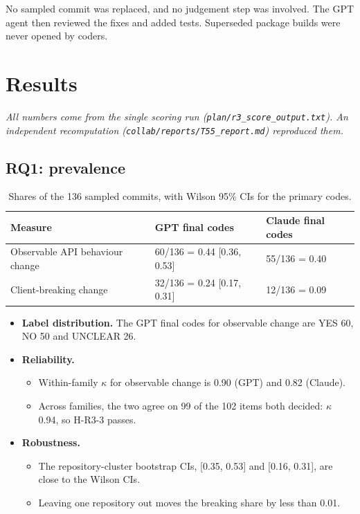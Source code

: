 \documentclass[conference]{IEEEtran}
\begin{document}
No sampled commit was replaced, and no judgement step was involved. The GPT agent then reviewed the fixes and added tests. Superseded package builds were never opened by coders.

\section{Results}
\emph{All numbers come from the single scoring run (\texttt{plan/\allowbreak{}r3\_score\_output.txt}). An independent recomputation (\texttt{collab/\allowbreak{}reports/\allowbreak{}T55\_report.md}) reproduced them.}

\subsection{RQ1: prevalence}
\begin{table}[t]
\caption{Shares of the 136 sampled commits, with Wilson 95\% CIs for the primary codes.}
\footnotesize
\begin{tabularx}{\linewidth}{Xll}
\toprule
Measure & GPT final codes & Claude final codes \\
\midrule
Observable API behaviour change & 60/136 = 0.44 [0.36, 0.53] & 55/136 = 0.40 \\
Client-breaking change & 32/136 = 0.24 [0.17, 0.31] & 12/136 = 0.09 \\
\bottomrule
\end{tabularx}
\end{table}

\begin{itemize}
\item \textbf{Label distribution.} The GPT final codes for observable change are YES 60, NO 50 and UNCLEAR 26.
\item \textbf{Reliability.}
\begin{itemize}
\item Within-family $\kappa$ for observable change is 0.90 (GPT) and 0.82 (Claude).
\item Across families, the two agree on 99 of the 102 items both decided: $\kappa$ 0.94, so H-R3-3 passes.
\end{itemize}
\item \textbf{Robustness.}
\begin{itemize}
\item The repository-cluster bootstrap CIs, [0.35, 0.53] and [0.16, 0.31], are close to the Wilson CIs.
\item Leaving one repository out moves the breaking share by less than 0.01.
\end{itemize}
\end{itemize}
\end{document}
